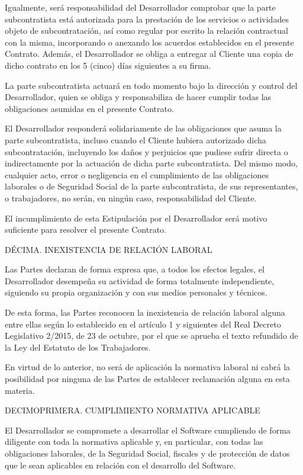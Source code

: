 \documentclass[a4paper,11pt]{report}
\begin{document}
Igualmente, será responsabilidad del Desarrollador comprobar que la
parte subcontratista está autorizada para la prestación de los servicios
o actividades objeto de subcontratación, así como regular por escrito la
relación contractual con la misma, incorporando o anexando los acuerdos
establecidos en el presente Contrato. Además, el Desarrollador se obliga
a entregar al Cliente una copia de dicho contrato en los 5 (cinco) días
siguientes a su firma.

La parte subcontratista actuará en todo momento bajo la dirección y
control del Desarrollador, quien se obliga y responsabiliza de hacer
cumplir todas las obligaciones asumidas en el presente Contrato.

El Desarrollador responderá solidariamente de las obligaciones que asuma
la parte subcontratista, incluso cuando el Cliente hubiera autorizado
dicha subcontratación, incluyendo los daños y perjuicios que pudiese
sufrir directa o indirectamente por la actuación de dicha parte
subcontratista. Del mismo modo, cualquier acto, error o negligencia en
el cumplimiento de las obligaciones laborales o de Seguridad Social de
la parte subcontratista, de sus representantes, o trabajadores, no
serán, en ningún caso, responsabilidad del Cliente.

El incumplimiento de esta Estipulación por el Desarrollador será motivo
suficiente para resolver el presente Contrato.

DÉCIMA. INEXISTENCIA DE RELACIÓN LABORAL

Las Partes declaran de forma expresa que, a todos los efectos legales,
el Desarrollador desempeña su actividad de forma totalmente
independiente, siguiendo su propia organización y con sus medios
personales y técnicos.

De esta forma, las Partes reconocen la inexistencia de relación laboral
alguna entre ellas según lo establecido en el artículo 1 y siguientes
del Real Decreto Legislativo 2/2015, de 23 de octubre, por el que se
aprueba el texto refundido de la Ley del Estatuto de los Trabajadores.

En virtud de lo anterior, no será de aplicación la normativa laboral ni
cabrá la posibilidad por ninguna de las Partes de establecer reclamación
alguna en esta materia.

DECIMOPRIMERA. CUMPLIMIENTO NORMATIVA APLICABLE

El Desarrollador se compromete a desarrollar el Software cumpliendo de
forma diligente con toda la normativa aplicable y, en particular, con
todas las obligaciones laborales, de la Seguridad Social, fiscales y de
protección de datos que le sean aplicables en relación con el desarrollo
del Software.
\end{document}
